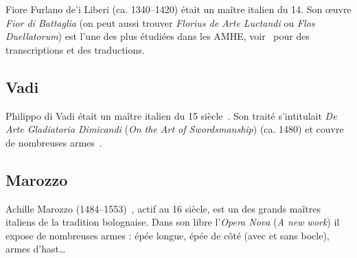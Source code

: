 Fiore Furlano de'i Liberi (ca. 1340–1420) était un maître italien du 14\ieme{}.
Son œuvre \emph{Fior di Battaglia} (on peut aussi trouver \emph{Florius de Arte Luctandi} ou \emph{Flos Duellatorum}) est l'une des plus étudiées dans les AMHE, voir~\cite{conan:fiore, exiles:fiore_getty} pour des transcriptions et des traductions.


\subsection{Vadi}
\label{app:maitres:vadi}

Philippo di Vadi était un maître italien du 15\ieme{} siècle~\cite{wiktenauer:vadi}.
Son traité s'intitulait \emph{De Arte Gladiatoria Dimicandi} (\emph{On the Art of Swordsmanship}) (ca. 1480) et couvre de nombreuses armes~\cite{ghilde:vadi, patrouix:vadi, petit:vadi}.


\subsection{Marozzo}
\label{app:maitres:marozzo}

Achille Marozzo (1484–1553)~\cite{wiktenauer:marozzo}, actif au 16\ieme{} siècle, est un des grands maîtres italiens de la tradition bolognaise.
Dans son libre l'\emph{Opera Nova} (\emph{A new work}) il expose de nombreuses armes : épée longue, épée de côté (avec et sans bocle), armes d'hast…

